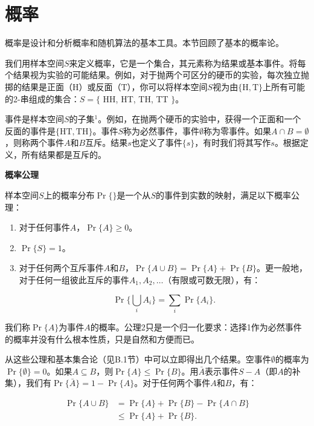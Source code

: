 \documentclass[lang=cn,newtx,10pt,scheme=chinese]{elegantbook}
\begin{document}
\section{概率}\label{section:C.2}

概率是设计和分析概率和随机算法的基本工具。本节回顾了基本的概率论。

我们用样本空间$S$来定义概率，它是一个集合，其元素称为结果或基本事件。将每个结果视为实验的可能结果。例如，对于抛两个可区分的硬币的实验，每次独立抛掷的结果是正面（$\mathrm{H}$）或反面（$\mathrm{T}$），你可以将样本空间$S$视为由$\{\mathrm{H}, \mathrm{T}\}$上所有可能的2-串组成的集合：$S=\{$ HH, HT, TH, TT $\}$。

事件是样本空间$S$的子集${ }^1$。例如，在抛两个硬币的实验中，获得一个正面和一个反面的事件是$\{\mathrm{HT}, \mathrm{TH}\}$。事件$S$称为必然事件，事件$\emptyset$称为零事件。如果$A \cap B=\emptyset$，则称两个事件$A$和$B$互斥。结果$s$也定义了事件$\{s\}$，有时我们将其写作$s$。根据定义，所有结果都是互斥的。

\textbf{概率公理}

样本空间$S$上的概率分布$\operatorname{Pr}\{\}$是一个从$S$的事件到实数的映射，满足以下概率公理：

\begin{enumerate}
\item 对于任何事件$A$，$\operatorname{Pr}\{A\} \geq 0$。
\item $\operatorname{Pr}\{S\}=1$。
\item 对于任何两个互斥事件$A$和$B$，$\operatorname{Pr}\{A \cup B\}=\operatorname{Pr}\{A\}+\operatorname{Pr}\{B\}$。更一般地，对于任何一组彼此互斥的事件$A_1, A_2, \ldots$（有限或可数无限），有：

$$
\operatorname{Pr}\{\bigcup_i A_i\}=\sum_i \operatorname{Pr}\{A_i\} .
$$
\end{enumerate}

我们称$\operatorname{Pr}\{A\}$为事件$A$的概率。公理2只是一个归一化要求：选择1作为必然事件的概率并没有什么根本性质，只是自然和方便而已。

从这些公理和基本集合论（见B.1节）中可以立即得出几个结果。空事件$\emptyset$的概率为$\operatorname{Pr}\{\emptyset\} = 0$。如果$A \subseteq B$，则$\operatorname{Pr}\{A\} \leq \operatorname{Pr}\{B\}$。用$\bar{A}$表示事件$S-A$（即$A$的补集），我们有$\operatorname{Pr}\{\bar{A}\}=1-\operatorname{Pr}\{A\}$。对于任何两个事件$A$和$B$，有：

$$
\begin{aligned}
\operatorname{Pr}\{A \cup B\} & =\operatorname{Pr}\{A\}+\operatorname{Pr}\{B\}-\operatorname{Pr}\{A \cap B\} \\
& \leq \operatorname{Pr}\{A\}+\operatorname{Pr}\{B\} .
\end{aligned}
$$
\end{document}
